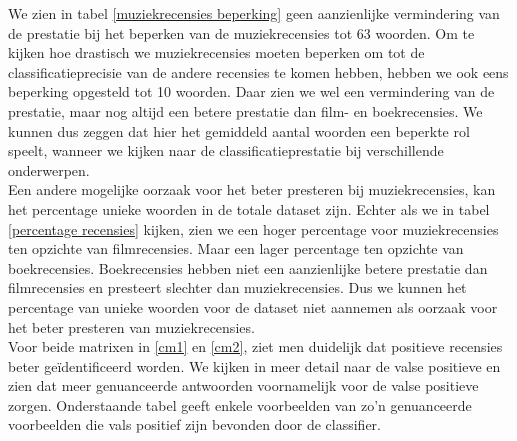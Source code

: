 We zien in tabel \ref{muziekrecensies beperking} geen aanzienlijke vermindering van de prestatie bij het beperken van de muziekrecensies tot 63 woorden. Om te kijken hoe drastisch we muziekrecensies moeten beperken om tot de classificatieprecisie van de andere recensies te komen hebben, hebben we ook eens beperking opgesteld tot 10 woorden. Daar zien we wel een vermindering van de prestatie, maar nog altijd een betere prestatie dan film- en boekrecensies. We kunnen dus zeggen dat hier het gemiddeld aantal woorden een beperkte rol speelt, wanneer we kijken naar de classificatieprestatie bij verschillende onderwerpen.\\

Een andere mogelijke oorzaak voor het beter presteren bij muziekrecensies, kan het percentage unieke woorden in de totale dataset zijn. Echter als we in tabel \ref{percentage recensies} kijken, zien we een hoger percentage voor muziekrecensies ten opzichte van filmrecensies. Maar een lager percentage ten opzichte van boekrecensies. Boekrecensies hebben niet een aanzienlijke betere prestatie dan filmrecensies en presteert slechter dan muziekrecensies. Dus we kunnen het percentage van unieke woorden voor de dataset niet aannemen als oorzaak voor het beter presteren van muziekrecensies.\\

Voor beide matrixen in \ref{cm1} en \ref{cm2}, ziet men duidelijk dat positieve recensies beter ge\"identificeerd worden. We kijken in meer detail naar de valse positieve en zien dat meer genuanceerde antwoorden voornamelijk voor de valse positieve zorgen. Onderstaande tabel geeft enkele voorbeelden van zo'n genuanceerde voorbeelden die vals positief zijn bevonden door de classifier.

